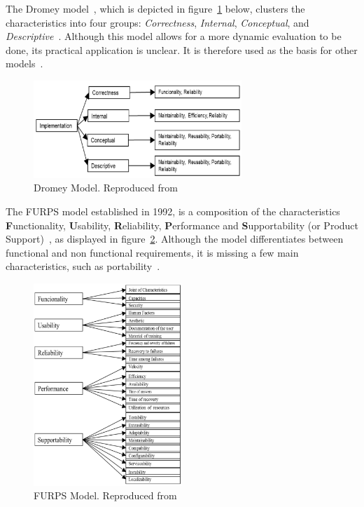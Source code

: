 The Dromey model~\cite{dromey}, which is depicted in figure~\ref{image_dromey} below,
clusters the characteristics
into four groups: \textit{Correctness}, \textit{Internal}, \textit{Conceptual}, and \textit{Descriptive}~\cite{quality_models}.
Although this model allows for a more dynamic evaluation to be
done, its practical application is unclear. It is therefore used as the
basis for other models~\cite{quality_models}.

\begin{figure}[h!]
\centering
\includegraphics[width=0.7\textwidth]{images/dromey.jpg}
\caption{Dromey Model. Reproduced from~\cite{quality_models}}
    \label{image_dromey}
\end{figure}

The FURPS model established in 1992, is a composition of the
characteristics \textbf{F}unctionality, \textbf{U}sability,
\textbf{R}eliability, \textbf{P}erformance and \textbf{S}upportability
(or Product Support)~\cite{furps},
as displayed in figure~\ref{image_furps}. Although the model differentiates between
functional and non functional requirements, it is missing a few main
characteristics, such as portability~\cite{quality_models}.

\begin{figure}[h!]
\centering
\includegraphics[width=0.5\textwidth]{images/furps.jpg}
\caption{FURPS Model. Reproduced from~\cite{quality_models}}
\label{image_furps}
\end{figure}

